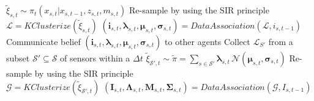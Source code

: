 \begin{frame}
\begin{columns}[T]
{			
			
			\centering
			
		}
		
		{
			\begin{algorithm}[H]
				\tiny
				\BlankLine
				\BlankLine
				\BlankLine
				\Begin
				{
					$ \tilde{\xi}_{s,t} \sim \pi_t (x_{s,t} | x_{s,t-1},z_{s,t},m_{s,t}) $
					\BlankLine
					Re-sample by using the SIR principle\\
					\BlankLine
					$ \mathcal{L} = KClusterize(\tilde{\xi}_{s,t}) $
					\BlankLine
					$ (\boldsymbol{i}_{s,t},\boldsymbol\lambda_{s,t},\boldsymbol\mu_{s,t},\boldsymbol\sigma_{s,t}) = DataAssociation(\mathcal{L}, i_{s,t-1}) $
					\BlankLine
					Communicate belief $ (\boldsymbol{i}_{s,t},\boldsymbol\lambda_{s,t},\boldsymbol\mu_{s,t},\boldsymbol\sigma_{s,t}) $ to other agents
				}
				\BlankLine
				\Begin
				{
					\textcolor{lightred}{Collect $ \mathcal{L}_{S'} $ from a subset $ \mathcal{S'} \subseteq \mathcal{S} $ of sensors within a $ \Delta t $}
					\BlankLine
					\textcolor{lightred}{$ \tilde{\xi}_{\mathcal{S'},t} \sim \tilde\pi = \sum_{s \in \mathcal{S'}} \boldsymbol\lambda_{s,t} \, \mathcal{N} (\boldsymbol\mu_{s,t},\boldsymbol\sigma_{s,t}) $}
					\BlankLine
					\textcolor{lightred}{Re-sample by using the SIR principle}\\
					\BlankLine
					\textcolor{lightred}{$ \mathcal{G} = KClusterize(\tilde\xi_{{\mathcal{S'},t}}) $}
					\BlankLine
					\textcolor{lightred}{$ (\boldsymbol{I}_{s,t},\boldsymbol\Lambda_{s,t},\boldsymbol{M}_{s,t},\boldsymbol\Sigma_{s,t}) = DataAssociation(\mathcal{G},I_{s,t-1}) $}
				}
			\end{algorithm}
			
}
\end{columns}
\end{frame}
